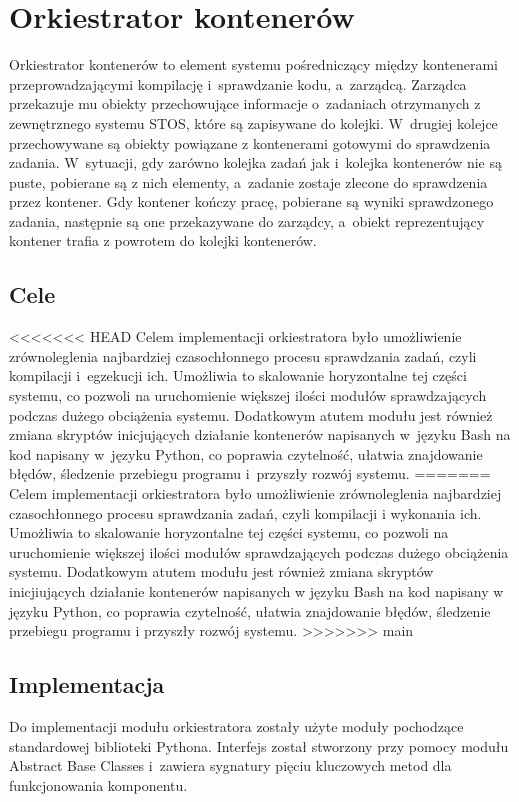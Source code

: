 \section{Orkiestrator kontenerów}
Orkiestrator kontenerów to element systemu pośredniczący między kontenerami przeprowadzającymi kompilację i~sprawdzanie kodu, a~zarządcą. Zarządca przekazuje mu obiekty przechowujące informacje o~zadaniach otrzymanych z zewnętrznego systemu STOS, które są zapisywane do kolejki. W~drugiej kolejce przechowywane są obiekty powiązane z kontenerami gotowymi do sprawdzenia zadania. W~sytuacji, gdy zarówno kolejka zadań jak i~kolejka kontenerów nie są puste, pobierane są z nich elementy, a~zadanie zostaje zlecone do sprawdzenia przez kontener. Gdy kontener kończy pracę, pobierane są wyniki sprawdzonego zadania, następnie są one przekazywane do zarządcy, a~obiekt reprezentujący kontener trafia z powrotem do kolejki kontenerów.

\subsection{Cele}
<<<<<<< HEAD
Celem implementacji orkiestratora było umożliwienie zrównoleglenia najbardziej czasochłonnego procesu sprawdzania zadań, czyli kompilacji i~egzekucji ich. Umożliwia to skalowanie horyzontalne tej części systemu, co pozwoli na uruchomienie większej ilości modułów sprawdzających podczas dużego obciążenia systemu. Dodatkowym atutem modułu jest również zmiana skryptów inicjujących działanie kontenerów napisanych w~języku Bash na kod napisany w~języku Python, co poprawia czytelność, ułatwia znajdowanie błędów, śledzenie przebiegu programu i~przyszły rozwój systemu.
=======
Celem implementacji orkiestratora było umożliwienie zrównoleglenia najbardziej czasochłonnego procesu sprawdzania zadań, czyli kompilacji i wykonania ich. Umożliwia to skalowanie horyzontalne tej części systemu, co pozwoli na uruchomienie większej ilości modułów sprawdzających podczas dużego obciążenia systemu. Dodatkowym atutem modułu jest również zmiana skryptów inicjiujących działanie kontenerów napisanych w języku Bash na kod napisany w języku Python, co poprawia czytelność, ułatwia znajdowanie błędów, śledzenie przebiegu programu i przyszły rozwój systemu.
>>>>>>> main


\subsection{Implementacja}
Do implementacji modułu orkiestratora zostały użyte moduły pochodzące standardowej biblioteki Pythona. Interfejs został stworzony przy pomocy modułu Abstract Base Classes\cite{pythonAbc} i~zawiera sygnatury pięciu kluczowych metod dla funkcjonowania komponentu. 

